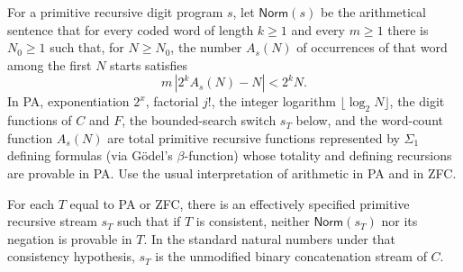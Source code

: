 \documentclass[11pt]{article}
\begin{document}
For a primitive recursive digit program \(s\), let \(\mathsf{Norm}(s)\) be the arithmetical sentence that for every coded word of length \(k\ge1\) and every \(m\ge1\) there is \(N_0\ge1\) such that, for \(N\ge N_0\), the number \(A_s(N)\) of occurrences of that word among the first \(N\) starts satisfies
\[
 m\,|2^k A_s(N)-N| < 2^k N .
\]
In PA, exponentiation \(2^x\), factorial \(j!\), the integer logarithm \(\lfloor\log_2 N\rfloor\), the digit functions of \(C\) and \(F\), the bounded-search switch \(s_T\) below, and the word-count function \(A_s(N)\) are total primitive recursive functions represented by \(\Sigma_1\) defining formulas (via G\"odel's \(\beta\)-function) whose totality and defining recursions are provable in PA. Use the usual interpretation of arithmetic in PA and in ZFC.

\begin{theorem}\label{thm:rosser}
For each \(T\) equal to PA or ZFC, there is an effectively specified primitive recursive stream \(s_T\) such that if \(T\) is consistent, neither \(\mathsf{Norm}(s_T)\) nor its negation is provable in \(T\). In the standard natural numbers under that consistency hypothesis, \(s_T\) is the unmodified binary concatenation stream of \(C\).
\end{theorem}
\end{document}
